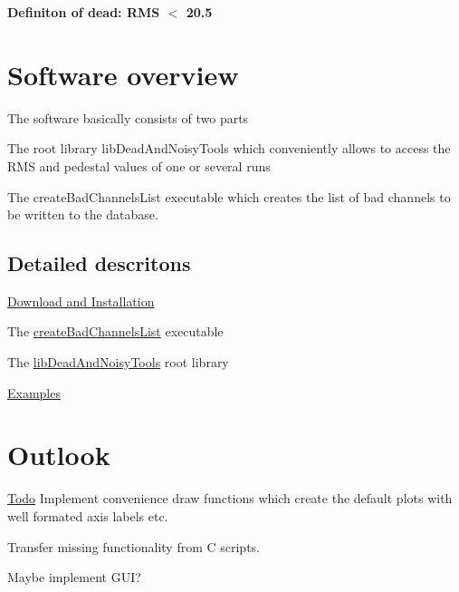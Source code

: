 {\bfseries Definiton of dead: RMS $<$ 20.5 }\hypertarget{index_SWOverview}{}\section{Software overview}\label{index_SWOverview}
The software basically consists of two parts \begin{DoxyItemize}
\item The root library {\ttfamily libDeadAndNoisyTools} which conveniently allows to access the RMS and pedestal values of one or several runs \item The {\ttfamily createBadChannelsList} executable which creates the list of bad channels to be written to the database.\end{DoxyItemize}
\hypertarget{index_pages}{}\subsection{Detailed descritons}\label{index_pages}
\begin{DoxyItemize}
\item \hyperlink{downloadinstall}{Download and Installation} \item The \hyperlink{createbadchannelslist_exe}{createBadChannelsList} executable \item The \hyperlink{rootlib}{libDeadAndNoisyTools} root library \item \hyperlink{examples}{Examples}\end{DoxyItemize}
\hypertarget{index_Outlook}{}\section{Outlook}\label{index_Outlook}
\begin{Desc}
\item[\hyperlink{todo__todo000007}{Todo}]Implement convenience draw functions which create the default plots with well formated axis labels etc. 

Transfer missing functionality from C scripts. 

Maybe implement GUI?\end{Desc}
